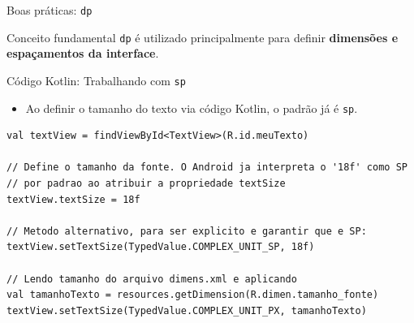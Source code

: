 \documentclass[aspectratio=169]{beamer}
\begin{document}
\begin{frame}{Boas práticas: \texttt{dp}}
\begin{center}

\end{center}

\vspace{0.1cm}

\begin{block}{Conceito fundamental}
\centering
\texttt{dp} é utilizado principalmente para definir
\textbf{dimensões e espaçamentos da interface}.
\end{block}

\end{frame}


\begin{frame}[fragile]{Código Kotlin: Trabalhando com \texttt{sp}}
\begin{itemize}
    \item Ao definir o tamanho do texto via código Kotlin, o padrão já é \texttt{sp}.
\end{itemize}
\vspace{0.2cm}
\begin{lstlisting}[style=KotlinStyle]
val textView = findViewById<TextView>(R.id.meuTexto)

// Define o tamanho da fonte. O Android ja interpreta o '18f' como SP
// por padrao ao atribuir a propriedade textSize
textView.textSize = 18f

// Metodo alternativo, para ser explicito e garantir que e SP:
textView.setTextSize(TypedValue.COMPLEX_UNIT_SP, 18f)

// Lendo tamanho do arquivo dimens.xml e aplicando
val tamanhoTexto = resources.getDimension(R.dimen.tamanho_fonte)
textView.setTextSize(TypedValue.COMPLEX_UNIT_PX, tamanhoTexto)
\end{lstlisting}
\end{frame}
\end{document}
